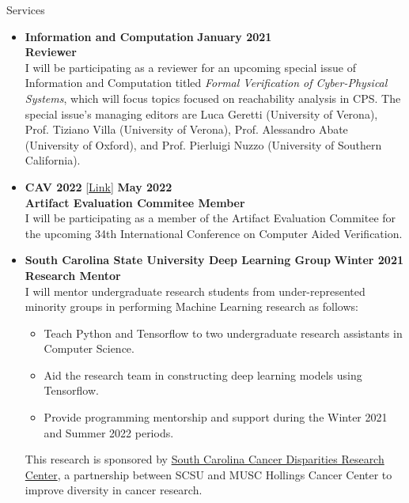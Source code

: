 \documentclass{resume} %
\begin{document}
\begin{rSection}{Services}

\begin{itemize}[leftmargin=*]
  \item {\bf Information and Computation} \hfill {\bf January 2021} \\
       {\bf Reviewer} \\
       I will be participating as a reviewer for an upcoming special issue of Information and Computation titled \textit{Formal Verification of Cyber-Physical Systems}, which will focus topics focused on reachability analysis in CPS. The special issue's managing editors are Luca Geretti (University of Verona), Prof. Tiziano Villa (University of Verona), Prof. Alessandro Abate (University of Oxford), and Prof. Pierluigi Nuzzo (University of Southern California).

       \item {\bf CAV 2022} [\href{http://i-cav.org/2022/organization/ }{Link}] \hfill {\bf May 2022}  \\
            {\bf Artifact Evaluation Commitee Member} \\
       I will be participating as a member of the Artifact Evaluation Commitee for the upcoming 34th International Conference on Computer Aided Verification.


  \item
      {\bf South Carolina State University Deep Learning Group} \hfill {\bf Winter 2021} \\
        {\bf Research Mentor} \\
      I will mentor undergraduate research students from under-represented minority groups in performing Machine Learning research as follows:

      \begin{itemize}[label=$\blackdiamond$]
        \item Teach Python and Tensorflow to two undergraduate research assistants in Computer Science.
        \item Aid the research team in constructing deep learning models using Tensorflow.
        \item Provide programming mentorship and support during the Winter 2021 and Summer 2022 periods.
      \end{itemize}

      This research is sponsored by \href{https://hollingscancercenter.musc.edu/outreach/statewide-commitments/sc-cadre}{South Carolina Cancer Disparities Research Center}, a partnership between SCSU and MUSC Hollings Cancer Center to improve diversity in cancer research.


\end{itemize}
\end{rSection}
\end{document}
